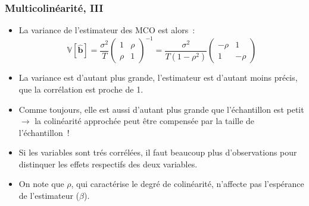 \documentclass[10pt]{beamer}
\theoremstyle{plain}
\begin{document}
\begin{frame}
  \frametitle{Multicolinéarité, III}

  \begin{itemize}


  \item La variance de l'estimateur des MCO est alors~:
    \[
      \mathbb V[\hat{\mathbf{b}}] = \frac{\sigma^2}{T}
      \begin{pmatrix}
        1 & \rho\\
        \rho & 1
      \end{pmatrix}^{-1}
      = \frac{\sigma^2}{T(1-\rho^2)}
      \begin{pmatrix}
        -\rho & 1\\
        1 & -\rho
      \end{pmatrix}
    \]

    \medskip

  \item La variance est d'autant plus grande, l'estimateur est d'autant moins précis, que la corrélation est proche de 1.\newline

  \item Comme toujours, elle est aussi d'autant plus grande que l'échantillon est petit $\rightarrow$ la colinéarité approchée peut être compensée par la taille de l'échantillon~!\newline

  \item Si les variables sont trés corrélées, il faut beaucoup plus d'observations pour distinquer les effets respectifs des deux variables.\newline

  \item On note que $\rho$, qui caractérise le degré de colinéarité, n'affecte pas l'espérance de l'estimateur ($\beta$).

  \end{itemize}

\end{frame}
\end{document}
